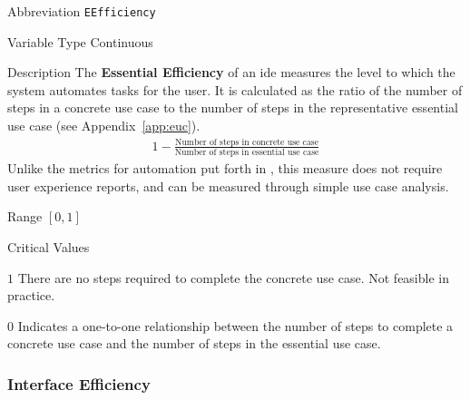 \begin{AlignedDesc}
  \item[Abbreviation] \texttt{EEfficiency}

  \item[Variable Type] Continuous

  \item[Description] The \textbf{Essential Efficiency} of an \ac{ide}
  measures the level to which the system automates tasks for the user. It
  is calculated as the ratio of the number of steps in a concrete use case
  to the number of steps in the representative essential use case (see
  Appendix~\ref{app:euc}). \cite{constantine1996}
%
  \begin{align*}
    1 - \frac{\text{Number of steps in concrete use case}}
             {\text{Number of steps in essential use case}}
  \end{align*}
%
  Unlike the metrics for automation put forth in \cite{Wei1998}, this
  measure does not require user experience reports, and can be measured
  through simple use case analysis.

  \item[Range] $[0, 1]$

  \item[Critical Values]
  \begin{AlignedDesc}
    \item[$1$] There are no steps required to complete the concrete use
    case. Not feasible in practice.
    \item[$0$] Indicates a one-to-one relationship between the number of
    steps to complete a concrete use case and the number of steps in the
    essential use case.
  \end{AlignedDesc}

\end{AlignedDesc}

\subsubsection{Interface Efficiency}
\label{subsec:iefficiency}

